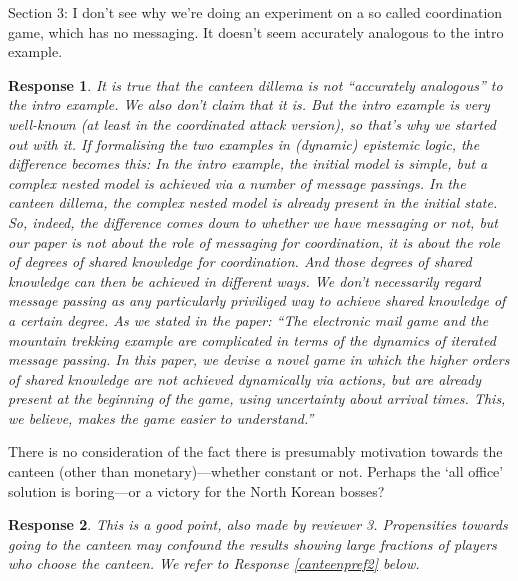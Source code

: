 \documentclass[a4paper]{article}
\newtheorem{response}{Response}
\begin{document}
Section 3: I don't see why we're doing an experiment on a so called coordination game, which has no messaging. It doesn't seem accurately analogous to the intro example. 

\begin{response}

It is true that the canteen dillema is not ``accurately analogous'' to the intro example. We also don't claim that it is. But the intro example is very well-known (at least in the coordinated attack version), so that's why we started out with it. If formalising the two examples in (dynamic) epistemic logic, the difference becomes this: In the intro example, the initial model is simple, but a complex nested model is achieved via a number of message passings. In the canteen dillema, the complex nested model is already present in the initial state. So, indeed, the difference comes down to whether we have messaging or not, but our paper is not about the role of messaging for coordination, it is about the role of degrees of shared knowledge for coordination. And those degrees of shared knowledge can then be achieved in different ways. We don't necessarily regard message passing as any particularly priviliged way to achieve shared knowledge of a certain degree. As we stated in the paper: ``The electronic mail game and the mountain trekking example are complicated in terms of the dynamics of iterated message passing. In this paper, we devise a novel game in which the higher orders of shared knowledge are not achieved dynamically via actions, but are already present at the beginning of the game, using uncertainty about arrival times. This, we believe, makes the game easier to understand.'' 
\end{response}


There is no consideration of the fact there is presumably motivation towards the canteen (other than monetary)—whether constant or not. Perhaps the `all office' solution is boring—or a victory for the North Korean bosses? 

\begin{response} 
This is a good point, also made by reviewer 3. Propensities towards going to the canteen may confound the results showing large fractions of players who choose the canteen. We refer to Response \ref{canteenpref2} below.
\end{response}
\end{document}
